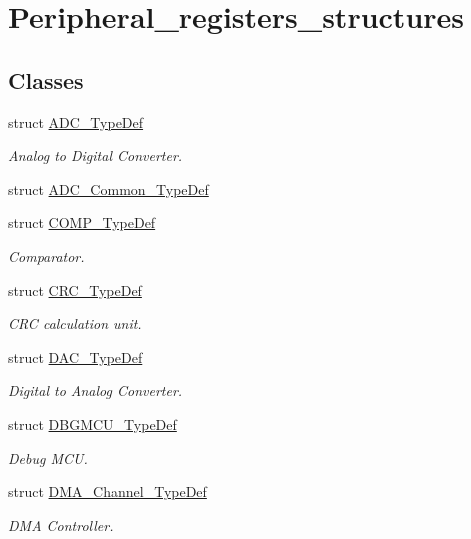 \hypertarget{group___peripheral__registers__structures}{\section{Peripheral\-\_\-registers\-\_\-structures}
\label{group___peripheral__registers__structures}
}
\subsection*{Classes}
\begin{DoxyCompactItemize}
\item 
struct \hyperlink{struct_a_d_c___type_def}{A\-D\-C\-\_\-\-Type\-Def}
\begin{DoxyCompactList}\small\item\em Analog to Digital Converter. \end{DoxyCompactList}\item 
struct \hyperlink{struct_a_d_c___common___type_def}{A\-D\-C\-\_\-\-Common\-\_\-\-Type\-Def}
\item 
struct \hyperlink{struct_c_o_m_p___type_def}{C\-O\-M\-P\-\_\-\-Type\-Def}
\begin{DoxyCompactList}\small\item\em Comparator. \end{DoxyCompactList}\item 
struct \hyperlink{struct_c_r_c___type_def}{C\-R\-C\-\_\-\-Type\-Def}
\begin{DoxyCompactList}\small\item\em C\-R\-C calculation unit. \end{DoxyCompactList}\item 
struct \hyperlink{struct_d_a_c___type_def}{D\-A\-C\-\_\-\-Type\-Def}
\begin{DoxyCompactList}\small\item\em Digital to Analog Converter. \end{DoxyCompactList}\item 
struct \hyperlink{struct_d_b_g_m_c_u___type_def}{D\-B\-G\-M\-C\-U\-\_\-\-Type\-Def}
\begin{DoxyCompactList}\small\item\em Debug M\-C\-U. \end{DoxyCompactList}\item 
struct \hyperlink{struct_d_m_a___channel___type_def}{D\-M\-A\-\_\-\-Channel\-\_\-\-Type\-Def}
\begin{DoxyCompactList}\small\item\em D\-M\-A Controller. \end{DoxyCompactList}\item 

\end{DoxyCompactItemize}
